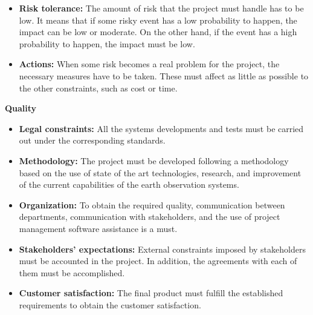 \begin{itemize}
	
	\item \textbf{Risk tolerance:} The amount of risk that the project must handle has to be low. It means that if some risky event has a low probability to happen, the impact can be low or moderate. On the other hand, if the event has a high probability to happen, the impact must be low.
	
	\item \textbf{Actions:} When some risk becomes a real problem for the project, the necessary measures have to be taken. These must affect as little as possible to the other constraints, such as cost or time.
	
\end{itemize}

\textbf{Quality}

\begin{itemize}
	
	\item \textbf{Legal constraints:} All the systems developments and tests must be carried out under the corresponding standards. 
	
	\item \textbf{Methodology:} The project must be developed following a methodology based on the use of state of the art technologies, research, and improvement of the current capabilities of the earth observation systems.
	
	\item \textbf{Organization:} To obtain the required quality, communication between departments, communication with stakeholders, and the use of project management software assistance is a must.
	
	\item \textbf{Stakeholders’ expectations:} External constraints imposed by stakeholders must be accounted in the project. In addition, the agreements with each of them must be accomplished.
	
	\item \textbf{Customer satisfaction:} The final product must fulfill the established requirements to obtain the customer satisfaction.
	
\end{itemize}